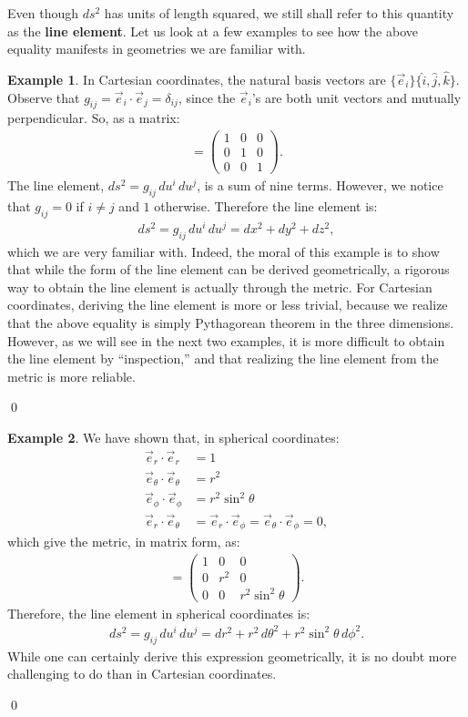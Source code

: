 \documentclass{book}
\theoremstyle{definition}
\newtheorem{exmp}{Example}[section]
\begin{document}
Even though $ds^2$ has units of length squared, we still shall refer to this quantity as the \textbf{line element}. Let us look at a few examples to see how the above equality manifests in geometries we are familiar with.
\begin{exmp}
In Cartesian coordinates, the natural basis vectors are $\{\vec{e}_i\} \{ \hat{i}, \hat{j}, \hat{k}\}$. Observe that $g_{ij} = \vec{e}_i \cdot \vec{e}_j = \delta_{ij}$, since the $\vec{e}_i$'s are both unit vectors and mutually perpendicular. So, as a matrix:
\begin{align*}
[g_{ij}] = 
\begin{pmatrix}
1 & 0 & 0\\
0 & 1 & 0\\
0 & 0 & 1
\end{pmatrix}.
\end{align*}
The line element, $ds^2 = g_{ij}\,du^i\,du^j$, is a sum of nine terms. However, we notice that $g_{ij} = 0 $ if $i\neq j$ and $1$ otherwise. Therefore the line element is:
\begin{align*}
ds^2 = g_{ij}\,du^i\,du^j = dx^2+dy^2+dz^2,
\end{align*}
which we are very familiar with. Indeed, the moral of this example is to show that while the form of the line element can be derived geometrically, a rigorous way to obtain the line element is actually through the metric. For Cartesian coordinates, deriving the line element is more or less trivial, because we realize that the above equality is simply Pythagorean theorem in the three dimensions. However, as we will see in the next two examples, it is more difficult to obtain the line element by ``inspection,'' and that realizing the line element from the metric is more reliable.   
\end{exmp}\qed
\begin{exmp}
We have shown that, in spherical coordinates:
\begin{align*}
\vec{e}_r\cdot\vec{e}_r &= 1\\
\vec{e}_\theta\cdot\vec{e}_\theta &= r^2\\
\vec{e}_\phi\cdot\vec{e}_\phi &= r^2\sin^2\theta\\
\vec{e}_r\cdot\vec{e}_\theta &= \vec{e}_r\cdot\vec{e}_\phi = \vec{e}_\theta\cdot\vec{e}_\phi = 0, 
\end{align*}
which give the metric, in matrix form, as:
\begin{align*}
[g_{ij}] = 
\begin{pmatrix}
1 & 0 & 0\\
0 & r^2 & 0 \\
0 & 0 & r^2\sin^2\theta
\end{pmatrix}.
\end{align*}
Therefore, the line element in spherical coordinates is:
\begin{align*}
ds^2 = g_{ij}\,du^i\,du^j = dr^2 + r^2\,d\theta^2 + r^2\sin^2\theta\,d\phi^2.
\end{align*}
While one can certainly derive this expression geometrically, it is no doubt more challenging to do than in Cartesian coordinates.
\end{exmp}\qed
\end{document}
